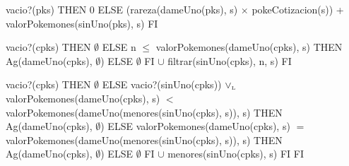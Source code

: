 \begin{tad}{}

		{\IF vacio?(pks) THEN
			0
		ELSE
			(rareza(dameUno(pks), s) $\times$ pokeCotizacion(s)) + valorPokemones(sinUno(pks), s)
		FI}


		{\IF vacio?(cpks) THEN
			$\emptyset$
		ELSE
			{\IF n $\leq$ valorPokemones(dameUno(cpks), s) THEN
				Ag(dameUno(cpks), $\emptyset$)
			ELSE
				$\emptyset$
			FI} $\cup$ filtrar(sinUno(cpks), n, s)
		FI}

		{\IF vacio?(cpks) THEN $\emptyset$ ELSE
			{\IF vacio?(sinUno(cpks)) $\lor_{\mathrm{\scriptscriptstyle{L}}}$ valorPokemones(dameUno(cpks), s) $<$ valorPokemones(dameUno(menores(sinUno(cpks), s)), s) THEN
				Ag(dameUno(cpks), $\emptyset$)
			ELSE
				{\IF valorPokemones(dameUno(cpks), s) $=$ valorPokemones(dameUno(menores(sinUno(cpks), s)), s) THEN
					Ag(dameUno(cpks), $\emptyset$)
				ELSE
					$\emptyset$
				FI} $\cup$  menores(sinUno(cpks), s)
			FI}
		FI}

\end{tad}
